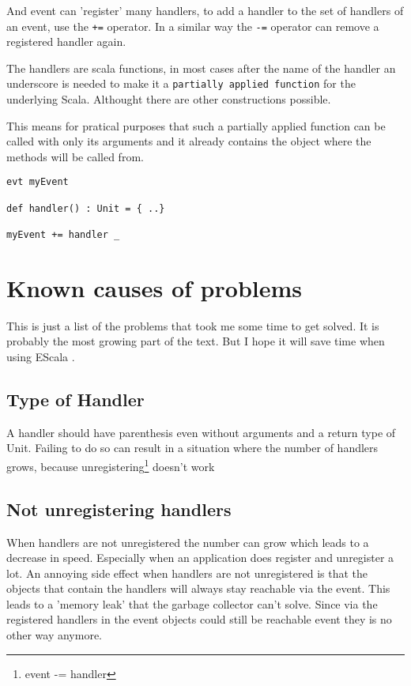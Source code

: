 \documentclass{article}
\newcommand{\escala}[0]{EScala }
\begin{document}
And event can 'register' many handlers, to add a handler to the
set of handlers of an event, use the {\tt +=} operator. In a similar
way the {\tt -=} operator can remove a registered handler again. 

The handlers are scala functions, in most cases after the name of 
the handler an underscore is  needed to make it 
a {\tt partially applied function} for the underlying Scala. 
Althought there are other constructions possible.


This means for pratical purposes that such a partially applied 
function can be called with only its arguments and it already 
contains the object where the methods will be called from.

\begin{lstlisting}
evt myEvent

def handler() : Unit = { ..}

myEvent += handler _
\end{lstlisting}

\section{Known causes of problems}

This is just a list of the problems that took me some
time to get solved. It is probably the most growing part
of the text. But I hope it will save time when using \escala.

\subsection{Type of Handler}
A handler should have parenthesis even without arguments and
a return type of Unit. Failing to do so can result in a situation
where the number of handlers grows, because 
unregistering\footnote{event -= handler} doesn't work

\subsection{Not unregistering handlers}
When handlers are not unregistered the number can grow which leads to
a decrease in speed. Especially when an application does register and
unregister a lot. An annoying side effect when handlers are not unregistered
is that the objects that contain the handlers will always stay reachable
via the event. This leads to a 'memory leak' that the garbage collector
can't solve. Since via the registered handlers in the event objects 
could still be reachable event they is no other way anymore.
\end{document}
